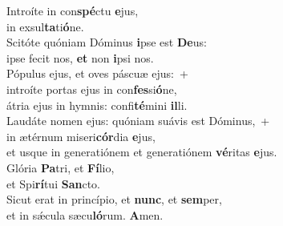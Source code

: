 \evenverse Introíte in con\textbf{spé}ctu \textbf{e}jus,~\*\\
\evenverse in exsul\textbf{ta}ti\textbf{ó}ne.\\
\oddverse Scitóte quóniam Dóminus \textbf{i}pse est \textbf{De}us:~\*\\
\oddverse ipse fecit nos, \textbf{et} non \textbf{i}psi nos.\\
\evenverse Pópulus ejus, et oves páscuæ ejus:~+\\
\evenverse  introíte portas ejus in con\textbf{fes}si\textbf{ó}ne,~\*\\
\evenverse átria ejus in hymnis: confi\textbf{té}mini \textbf{il}li.\\
\oddverse Laudáte nomen ejus: quóniam suávis est Dóminus,~+\\
\oddverse  in ætérnum miseri\textbf{cór}dia \textbf{e}jus,~\*\\
\oddverse et usque in generatiónem et generatiónem \textbf{vé}ritas \textbf{e}jus.\\
\evenverse Glória \textbf{Pa}tri, et \textbf{Fí}lio,~\*\\
\evenverse et Spi\textbf{rí}tui \textbf{San}cto.\\
\oddverse Sicut erat in princípio, et \textbf{nunc}, et \textbf{sem}per,~\*\\
\oddverse et in sǽcula sæcu\textbf{ló}rum. \textbf{A}men.\\
